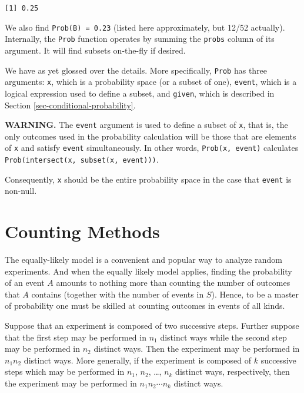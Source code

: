 \documentclass[]{book}
\numberwithin{equation}{chapter}
\numberwithin{figure}{chapter}
\theoremstyle{plain}
\theoremstyle{definition}
\theoremstyle{remark}
\theoremstyle{definition}
\theoremstyle{definition}
\theoremstyle{remark}
\let\BeginKnitrBlock\begin \let\EndKnitrBlock\end
\begin{document}
\begin{verbatim}
[1] 0.25
\end{verbatim}

We also find \texttt{Prob(B)\ =\ 0.23} (listed here approximately, but
12/52 actually). Internally, the \texttt{Prob} function operates by
summing the \texttt{probs} column of its argument. It will find subsets
on-the-fly if desired.

We have as yet glossed over the details. More specifically,
\texttt{Prob} has three arguments: \texttt{x}, which is a probability
space (or a subset of one), \texttt{event}, which is a logical
expression used to define a subset, and \texttt{given}, which is
described in Section \ref{sec-conditional-probability}.

\textbf{WARNING.} The \texttt{event} argument is used to define a subset
of \texttt{x}, that is, the only outcomes used in the probability
calculation will be those that are elements of \texttt{x} and satisfy
\texttt{event} simultaneously. In other words, \texttt{Prob(x,\ event)}
calculates \texttt{Prob(intersect(x,\ subset(x,\ event)))}.

Consequently, \texttt{x} should be the entire probability space in the
case that \texttt{event} is non-null.

\section{Counting Methods}\label{sec-methods-of-counting}

The equally-likely model is a convenient and popular way to analyze
random experiments. And when the equally likely model applies, finding
the probability of an event \(A\) amounts to nothing more than counting
the number of outcomes that \(A\) contains (together with the number of
events in \(S\)). Hence, to be a master of probability one must be
skilled at counting outcomes in events of all kinds.

\bigskip

\BeginKnitrBlock{proposition}[The Multiplication Principle]
\protect\hypertarget{prp:unnamed-chunk-130}{}{\label{prp:unnamed-chunk-130}
\iffalse (The Multiplication Principle) \fi }Suppose that an experiment
is composed of two successive steps. Further suppose that the first step
may be performed in \(n_{1}\) distinct ways while the second step may be
performed in \(n_{2}\) distinct ways. Then the experiment may be
performed in \(n_{1}n_{2}\) distinct ways. More generally, if the
experiment is composed of \(k\) successive steps which may be performed
in \(n_{1}\), \(n_{2}\), \ldots{}, \(n_{k}\) distinct ways,
respectively, then the experiment may be performed in
\(n_{1} n_{2} \cdots n_{k}\) distinct ways.
\EndKnitrBlock{proposition}
\end{document}
